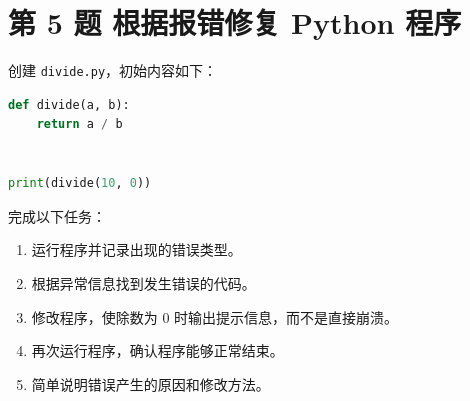 \documentclass[a4paper,12pt]{report}
\begin{document}
\section{第 5 题 根据报错修复 Python 程序}


创建 \texttt{divide.py}，初始内容如下：

\begin{lstlisting}[language=Python]
def divide(a, b):
    return a / b


print(divide(10, 0))
\end{lstlisting}

完成以下任务：

\begin{enumerate}
  \item 运行程序并记录出现的错误类型。
  \item 根据异常信息找到发生错误的代码。
  \item 修改程序，使除数为 0 时输出提示信息，而不是直接崩溃。
  \item 再次运行程序，确认程序能够正常结束。
  \item 简单说明错误产生的原因和修改方法。
\end{enumerate}

\end{document}
